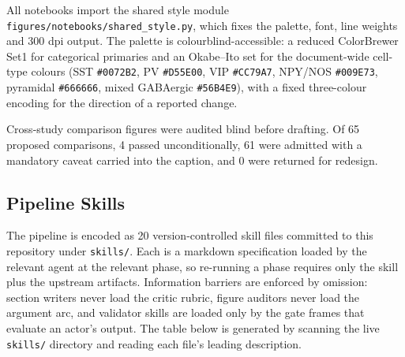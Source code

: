 \documentclass[11pt]{article}
\begin{document}
All notebooks import the shared style module \texttt{figures/notebooks/shared\_style.py}, which fixes the palette, font, line weights and 300 dpi output. The palette is colourblind-accessible: a reduced ColorBrewer Set1 for categorical primaries and an Okabe--Ito set for the document-wide cell-type colours (SST \texttt{\#0072B2}, PV \texttt{\#D55E00}, VIP \texttt{\#CC79A7}, NPY/NOS \texttt{\#009E73}, pyramidal \texttt{\#666666}, mixed GABAergic \texttt{\#56B4E9}), with a fixed three-colour encoding for the direction of a reported change.

Cross-study comparison figures were audited blind before drafting. Of 65 proposed comparisons, 4 passed unconditionally, 61 were admitted with a mandatory caveat carried into the caption, and 0 were returned for redesign.

\subsection{Pipeline Skills}
\label{sec-methods-skills}

The pipeline is encoded as 20 version-controlled skill files committed to this repository under \texttt{skills/}. Each is a markdown specification loaded by the relevant agent at the relevant phase, so re-running a phase requires only the skill plus the upstream artifacts. Information barriers are enforced by omission: section writers never load the critic rubric, figure auditors never load the argument arc, and validator skills are loaded only by the gate frames that evaluate an actor's output. The table below is generated by scanning the live \texttt{skills/} directory and reading each file's leading description.
\end{document}
